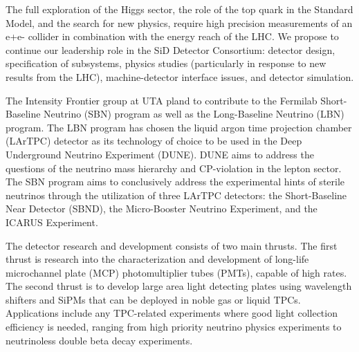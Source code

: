 \documentclass[preprint,11pt]{article}
\begin{document}
The full exploration of the Higgs sector, the role of the top quark in the Standard Model, and the search for new physics, require high precision measurements of an e+e- collider in combination with the energy reach of the LHC. We propose to continue our leadership role in the SiD Detector Consortium: detector design, specification of subsystems, physics studies (particularly in response to new results from the LHC), machine-detector interface issues, and detector simulation. 

The Intensity Frontier group at UTA pland to contribute to the Fermilab Short-Baseline Neutrino (SBN) program as well as the Long-Baseline Neutrino (LBN) program. The LBN program has chosen the liquid argon time projection chamber (LArTPC) detector as its technology of choice to be used in the Deep Underground Neutrino Experiment (DUNE).  DUNE aims to address the questions of the neutrino mass hierarchy and CP-violation in the lepton sector. The SBN program aims to conclusively address the experimental hints of sterile neutrinos through the utilization of three LArTPC detectors: the Short-Baseline Near Detector (SBND), the Micro-Booster Neutrino Experiment, and the ICARUS Experiment.

The detector research and development consists of two main thrusts. The first thrust is research into the characterization and development of long-life microchannel plate (MCP) photomultiplier tubes (PMTs), capable of high rates. The second thrust is to develop large area light detecting plates using wavelength shifters and SiPMs that can be deployed in noble gas or liquid TPCs.  Applications include any TPC-related experiments where good light collection efficiency is needed, ranging from high priority neutrino physics experiments to neutrinoless double beta decay experiments.
\end{document}
